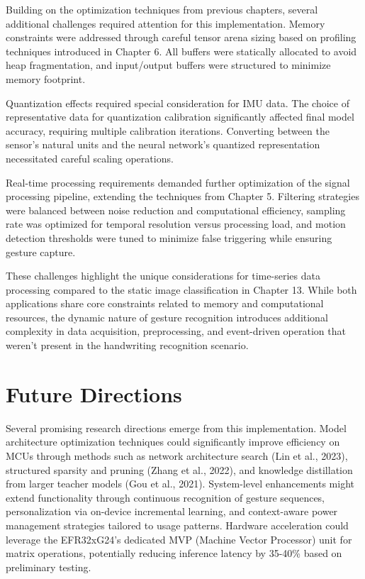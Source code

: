 \documentclass[
  9pt,
  letterpaper,
  abstract,
  titlepage]{scrbook}
\begin{document}
Building on the optimization techniques from previous chapters, several
additional challenges required attention for this implementation. Memory
constraints were addressed through careful tensor arena sizing based on
profiling techniques introduced in Chapter 6. All buffers were
statically allocated to avoid heap fragmentation, and input/output
buffers were structured to minimize memory footprint.

Quantization effects required special consideration for IMU data. The
choice of representative data for quantization calibration significantly
affected final model accuracy, requiring multiple calibration
iterations. Converting between the sensor's natural units and the neural
network's quantized representation necessitated careful scaling
operations.

Real-time processing requirements demanded further optimization of the
signal processing pipeline, extending the techniques from Chapter 5.
Filtering strategies were balanced between noise reduction and
computational efficiency, sampling rate was optimized for temporal
resolution versus processing load, and motion detection thresholds were
tuned to minimize false triggering while ensuring gesture capture.

These challenges highlight the unique considerations for time-series
data processing compared to the static image classification in Chapter
13. While both applications share core constraints related to memory and
computational resources, the dynamic nature of gesture recognition
introduces additional complexity in data acquisition, preprocessing, and
event-driven operation that weren't present in the handwriting
recognition scenario.

\section{Future Directions}\label{future-directions}

Several promising research directions emerge from this implementation.
Model architecture optimization techniques could significantly improve
efficiency on MCUs through methods such as network architecture search
(Lin et al., 2023), structured sparsity and pruning (Zhang et al.,
2022), and knowledge distillation from larger teacher models (Gou et
al., 2021). System-level enhancements might extend functionality through
continuous recognition of gesture sequences, personalization via
on-device incremental learning, and context-aware power management
strategies tailored to usage patterns. Hardware acceleration could
leverage the EFR32xG24's dedicated MVP (Machine Vector Processor) unit
for matrix operations, potentially reducing inference latency by 35-40\%
based on preliminary testing.
\end{document}
